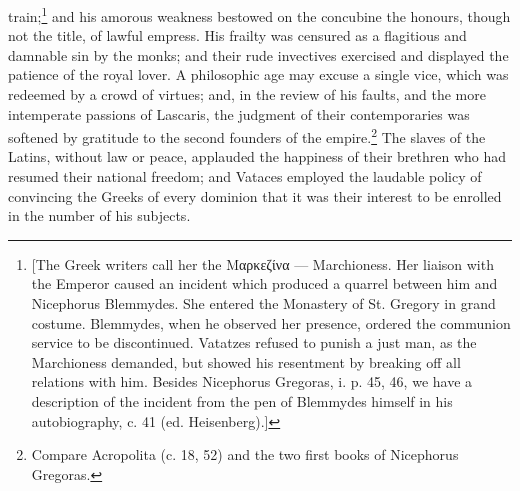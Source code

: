 train;\footnote{[The Greek writers call her the \textgreek{Μαρκεζίνα} \texthebrew{—} Marchioness. Her liaison with the Emperor caused an incident which produced a quarrel between him and Nicephorus Blemmydes. She entered the Monastery of St. Gregory in grand costume. Blemmydes, when he observed her presence, ordered the communion service to be discontinued. Vatatzes refused to punish a just man, as the Marchioness demanded, but showed his resentment by breaking off all relations with him. Besides Nicephorus Gregoras, i. p. 45, 46, we have a description of the incident from the pen of Blemmydes himself in his autobiography, c. 41 (ed. Heisenberg).]} and his amorous weakness bestowed on the concubine the honours, though not the title, of lawful empress. His frailty was censured as a flagitious and damnable sin by the monks; and their rude invectives exercised and displayed the patience of the royal lover. A philosophic age may excuse a single vice, which was redeemed by a crowd of virtues; and, in the review of his faults, and the more intemperate passions of Lascaris, the judgment of their contemporaries was softened by gratitude to the second founders of the empire.\footnote{Compare Acropolita (c. 18, 52) and the two first books of Nicephorus Gregoras.} The slaves of the Latins, without law or peace, applauded the happiness of their brethren who had resumed their national freedom; and Vataces employed the laudable policy of convincing the Greeks of every dominion that it was their interest to be enrolled in the number of his subjects.

